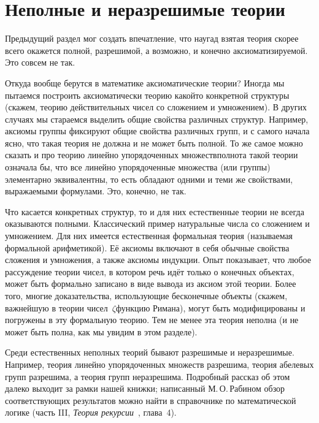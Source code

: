 \section{Неполные и неразрешимые теории}
        \label{noncomplete-undecidable}

Предыдущий раздел мог создать впечатление, что наугад взятая
теория скорее всего окажется полной, разрешимой, а возможно, и
конечно аксиоматизируемой. Это совсем не так.

Откуда вообще берутся в математике аксиоматические теории?
Иногда мы пытаемся построить аксиоматически теорию какой\д то
конкретной структуры (скажем, теорию действительных чисел со
сложением и умножением). В других случаях мы стараемся выделить
общие свойства различных структур. Например, аксиомы группы
фиксируют общие свойства различных групп, и с самого начала
ясно, что такая теория не должна и не может быть полной. То же
самое можно сказать и про теорию линейно упорядоченных
множеств\т полнота такой теории означала бы, что все линейно
упорядоченные множества (или группы) элементарно эквивалентны,
то есть обладают одними и теми же свойствами, выражаемыми
формулами. Это, конечно, не так.

Что касается конкретных структур, то и для них естественные
теории не всегда оказываются полными. Классический пример\т
натуральные числа со сложением и умножением. Для них имеется
естественная формальная теория (называемая формальной
арифметикой). Её аксиомы включают в себя обычные свойства
сложения и умножения, а также аксиомы индукции. Опыт показывает,
что любое рассуждение теории чисел, в котором речь идёт только о
конечных объектах, может быть формально записано в виде вывода
из аксиом этой теории. Более того, многие доказательства,
использующие бесконечные объекты (скажем, важнейшую в теории
чисел~$\zeta$\д функцию Римана),%
%
могут быть модифицированы
и погружены в эту формальную теорию. Тем не менее эта теория
неполна (и не может быть полна, как мы увидим в этом разделе).

Среди естественных неполных теорий бывают разрешимые и
не\-раз\-ре\-ши\-мые. Например, теория линейно упорядоченных множеств
разрешима, теория абелевых групп разрешима, а теория групп
не\-раз\-ре\-ши\-ма. Подробный рассказ об этом далеко выходит за рамки
нашей книжки; написанный М.\,О.\,Рабином%
обзор соответствующих
результатов можно найти в справочнике по математической логике
(часть III, \emph{Теория рекурсии}~\cite{handbook-recursion},
глава~4).


